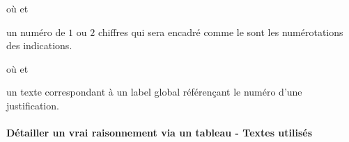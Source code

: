 \documentclass[12pt,a4paper]{article}
\begin{document}
\separation


 où \quad {}
                            et 

\IDarg{} un numéro de $1$ ou $2$ chiffres qui sera encadré comme le sont les numérotations des indications.


\separation


 où \quad {}
                             et 

\IDarg{} un texte correspondant à un label global référençant le numéro d'une justification.


\paragraph{Détailler un \og vrai \fg{} raisonnement via un tableau - Textes utilisés}





\extraspace



\end{document}
